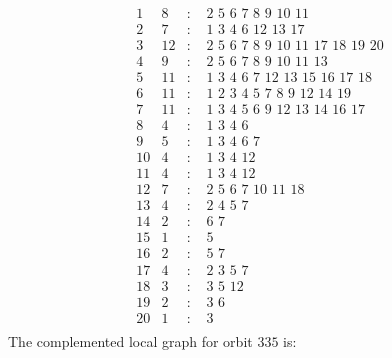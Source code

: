 \documentclass[12pt]{article}
\begin{document}
\begin{equation*}
\begin{array}{rrcl}
1&8&:&\,\,2\,\,5\,\,6\,\,7\,\,8\,\,9\,\,10\,\,11\\
2&7&:&\,\,1\,\,3\,\,4\,\,6\,\,12\,\,13\,\,17\\
3&12&:&\,\,2\,\,5\,\,6\,\,7\,\,8\,\,9\,\,10\,\,11\,\,17\,\,18\,\,19\,\,20\\
4&9&:&\,\,2\,\,5\,\,6\,\,7\,\,8\,\,9\,\,10\,\,11\,\,13\\
5&11&:&\,\,1\,\,3\,\,4\,\,6\,\,7\,\,12\,\,13\,\,15\,\,16\,\,17\,\,18\\
6&11&:&\,\,1\,\,2\,\,3\,\,4\,\,5\,\,7\,\,8\,\,9\,\,12\,\,14\,\,19\\
7&11&:&\,\,1\,\,3\,\,4\,\,5\,\,6\,\,9\,\,12\,\,13\,\,14\,\,16\,\,17\\
8&4&:&\,\,1\,\,3\,\,4\,\,6\\
9&5&:&\,\,1\,\,3\,\,4\,\,6\,\,7\\
10&4&:&\,\,1\,\,3\,\,4\,\,12\\
11&4&:&\,\,1\,\,3\,\,4\,\,12\\
12&7&:&\,\,2\,\,5\,\,6\,\,7\,\,10\,\,11\,\,18\\
13&4&:&\,\,2\,\,4\,\,5\,\,7\\
14&2&:&\,\,6\,\,7\\
15&1&:&\,\,5\\
16&2&:&\,\,5\,\,7\\
17&4&:&\,\,2\,\,3\,\,5\,\,7\\
18&3&:&\,\,3\,\,5\,\,12\\
19&2&:&\,\,3\,\,6\\
20&1&:&\,\,3\\
\end{array}
\end{equation*}
The complemented local graph for orbit $335$ is:
\end{document}
